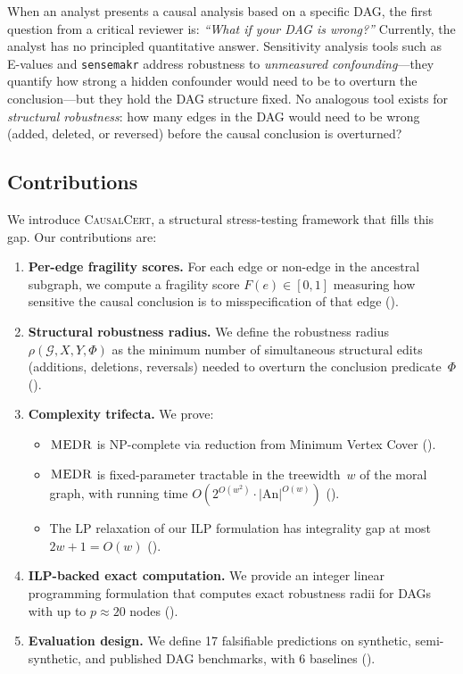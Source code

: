 \documentclass[11pt,a4paper]{article}
\theoremstyle{definition}
\theoremstyle{remark}
\newcommand{\DAG}{\mathcal{G}}
\newcommand{\An}{\mathrm{An}}
\newcommand{\fragility}{F}
\newcommand{\radius}{\rho}
\newcommand{\MEDR}{\textsc{MEDR}}
\newcommand{\Phi}{\varPhi}
\begin{document}
When an analyst presents a causal analysis based on a specific DAG, the first question
from a critical reviewer is: \emph{``What if your DAG is wrong?''} Currently, the
analyst has no principled quantitative answer. Sensitivity analysis tools such as
E-values \cite{vanderweele2017} and \texttt{sensemakr} \cite{cinelli2020} address
robustness to \emph{unmeasured confounding}---they quantify how strong a hidden
confounder would need to be to overturn the conclusion---but they hold the DAG structure
fixed. No analogous tool exists for \emph{structural robustness}: how many edges in the
DAG would need to be wrong (added, deleted, or reversed) before the causal conclusion
is overturned?

\subsection{Contributions}

We introduce \textsc{CausalCert}, a structural stress-testing framework that fills this
gap. Our contributions are:

\begin{enumerate}[label=(\roman*)]
\item \textbf{Per-edge fragility scores.} For each edge or non-edge in the ancestral
  subgraph, we compute a fragility score $\fragility(e) \in [0,1]$ measuring how
  sensitive the causal conclusion is to misspecification of that edge
  ().

\item \textbf{Structural robustness radius.} We define the robustness radius
  $\radius(\DAG, X, Y, \Phi)$ as the minimum number of simultaneous structural edits
  (additions, deletions, reversals) needed to overturn the conclusion predicate~$\Phi$
  ().

\item \textbf{Complexity trifecta.} We prove:
  \begin{itemize}
    \item $\MEDR$ is NP-complete via reduction from Minimum Vertex Cover ().
    \item $\MEDR$ is fixed-parameter tractable in the treewidth~$w$ of the moral graph,
          with running time $O(2^{O(w^2)} \cdot |\An|^{O(w)})$ ().
    \item The LP relaxation of our ILP formulation has integrality gap at most
          $2w + 1 = O(w)$ ().
  \end{itemize}

\item \textbf{ILP-backed exact computation.} We provide an integer linear programming
  formulation that computes exact robustness radii for DAGs with up to $p \approx 20$
  nodes ().

\item \textbf{Evaluation design.} We define 17 falsifiable predictions on synthetic,
  semi-synthetic, and published DAG benchmarks, with 6 baselines ().
\end{enumerate}
\end{document}
